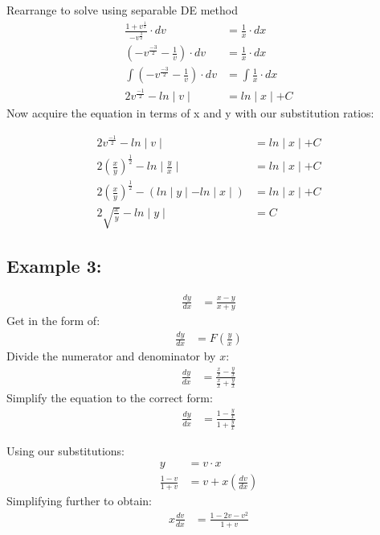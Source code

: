 \documentclass{article}
\begin{document}
\begin{flushleft}
{Rearrange to solve using separable DE method\\
\begin{align*}
\frac{1 + v^\frac{1}{2}}{-v^\frac{3}{2}} \cdot dv & = \frac{1}{x} \cdot dx \\
(-v^\frac{-3}{2} - \frac{1}{v}) \cdot dv & = \frac{1}{x} \cdot dx \\
\int (-v^\frac{-3}{2} - \frac{1}{v}) \cdot dv & = \int \frac{1}{x} \cdot dx  \\
2v^\frac{-1}{2} - ln \mid v \mid & = ln \mid x \mid + C 
\end{align*}
\newpage
Now acquire the equation in terms of x and y with our substitution ratios:

\begin{align*}
2v^\frac{-1}{2} - ln \mid v \mid & = ln \mid x \mid + C \\
2(\frac{x}{y})^\frac{1}{2} - ln \mid \frac{y}{x} \mid & = ln \mid x \mid + C \\
2(\frac{x}{y})^\frac{1}{2} - (ln \mid y \mid - ln \mid x \mid) & = ln \mid x \mid + C \\
2\sqrt{\frac{x}{y}} - ln \mid y \mid & = C 
\end{align*}
\bigskip
\subsection*{\textbf{Example 3:}}
\begin{align*}
\frac{dy}{dx} & = \frac{x-y}{x+y}
\end{align*}
Get in the form of:\\
\begin{align*}
\frac{dy}{dx} & = F (\frac{y}{x})
\end{align*}
Divide the numerator and denominator by $x$:\\
\begin{align*}
\frac{dy}{dx} & = \frac{\frac{x}{x}-\frac{y}{x}}{\frac{x}{x}+\frac{y}{x}}
\end{align*}
Simplify the equation to the correct form:
\begin{align*}
\frac{dy}{dx} & = \frac{1-\frac{y}{x}}{1+\frac{y}{x}}
\end{align*}

Using our substitutions:
\begin{align*}
y & = v \cdot  x\\
\frac{1-v}{1+v} & = v + x(\frac{dv}{dx})
 \end{align*}
 Simplifying further to obtain:
\begin{align*}
x \frac{dv}{dx} & = \frac{1-2v-v^2}{1+v}
 \end{align*} 
 
}
\end{flushleft}
\end{document}
